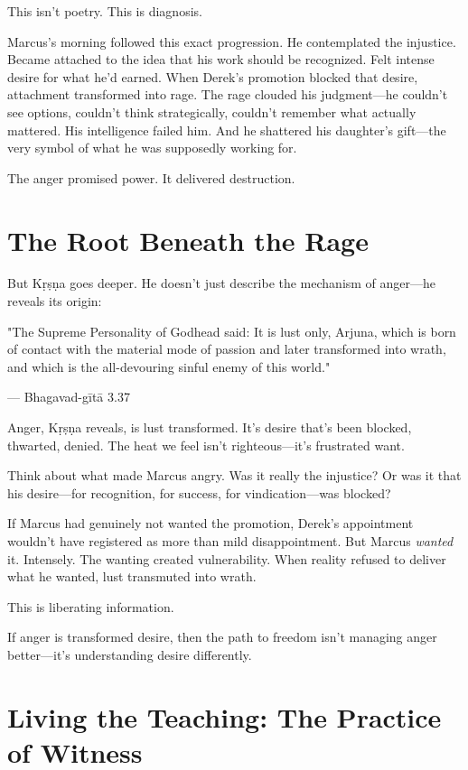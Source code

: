\documentclass[11pt,twoside]{book}
\begin{document}
This isn't poetry. This is diagnosis.

Marcus's morning followed this exact progression. He contemplated the injustice. Became attached to the idea that his work should be recognized. Felt intense desire for what he'd earned. When Derek's promotion blocked that desire, attachment transformed into rage. The rage clouded his judgment—he couldn't see options, couldn't think strategically, couldn't remember what actually mattered. His intelligence failed him. And he shattered his daughter's gift—the very symbol of what he was supposedly working for.

The anger promised power. It delivered destruction.

\section*{The Root Beneath the Rage}

But Kṛṣṇa goes deeper. He doesn't just describe the mechanism of anger—he reveals its origin:

\begin{pullquote}
"The Supreme Personality of Godhead said: It is lust only, Arjuna, which is born of contact with the material mode of passion and later transformed into wrath, and which is the all-devouring sinful enemy of this world."

--- Bhagavad-gītā 3.37
\end{pullquote}

Anger, Kṛṣṇa reveals, is lust transformed. It's desire that's been blocked, thwarted, denied. The heat we feel isn't righteous—it's frustrated want.

Think about what made Marcus angry. Was it really the injustice? Or was it that his desire—for recognition, for success, for vindication—was blocked?

If Marcus had genuinely not wanted the promotion, Derek's appointment wouldn't have registered as more than mild disappointment. But Marcus \textit{wanted} it. Intensely. The wanting created vulnerability. When reality refused to deliver what he wanted, lust transmuted into wrath.

This is liberating information.

If anger is transformed desire, then the path to freedom isn't managing anger better—it's understanding desire differently.

\section*{Living the Teaching: The Practice of Witness}
\end{document}
